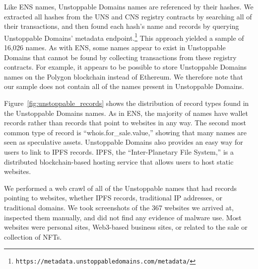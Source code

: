 Like ENS names, Unstoppable Domains names are referenced by their hashes. We 
extracted all hashes from the UNS and CNS registry contracts 
by searching all of their transactions, and then found each 
hash's name and records by querying Unstoppable Domains' 
metadata endpoint.\footnote{	
\texttt{https://metadata.unstoppabledomains.com/metadata/}} 
This approach yielded a sample of 16,026 names. As with ENS, 
some names appear to exist in Unstoppable Domains that cannot 
be found by collecting transactions from these registry 
contracts. For example, it appears to be possible to store Unstoppable Domains 
names on the Polygon blockchain instead of Ethereum. We therefore note that our 
sample does not contain all of the names present in Unstoppable Domains.

Figure~\ref{fig:unstoppable_records} shows the distribution 
of record types found in the Unstoppable Domains names. As in 
ENS, the majority of names have wallet records rather than 
records that point to websites in any way. The second most common 
type of record is ``whois.for\_sale.value,'' showing that many 
names are seen as speculative assets. Unstoppable Domains also 
provides an easy way for users to link to IPFS records. IPFS, 
the ``Inter-Planetary File System,'' is a distributed 
blockchain-based hosting service that allows users to host 
static websites.

We performed a web crawl of all of the Unstoppable names that 
had records pointing to websites, whether IPFS records, 
traditional IP addresses, or traditional domains. We took 
screenshots of the 367 websites we arrived 
at, inspected them manually, and did not find any evidence of 
malware use. Most 
websites were personal sites, Web3-based business sites, or related to the sale 
or collection of NFTs. 




